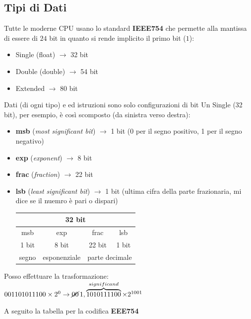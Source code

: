 \documentclass[a4paper,12pt, oneside]{book}
\begin{document}
\subsection{Tipi di Dati}
Tutte le moderne CPU usano lo standard \textbf{IEEE754} che permette alla mantissa di essere di $24$ bit  in quanto si rende implicito il primo bit ($1$):
\begin{itemize}
  \item Single (float) $\rightarrow$ 32 bit
  \item Double (double) $\rightarrow$ 54 bit
  \item Extended $\rightarrow$ 80 bit
\end{itemize}
Dati (di ogni tipo) e ed istruzioni sono solo configurazioni di bit
Un Single (32 bit), per esempio, è così scomposto (da sinistra verso destra):
\begin{itemize}
  \item \textbf{msb} (\textit{most significant bit}) $\rightarrow$ 1 bit (0 per il segno positivo, 1 per il segno negativo)
  \item \textbf{exp} (\textit{exponent}) $\rightarrow$ 8 bit
  \item \textbf{frac} (\textit{fraction}) $\rightarrow$ 22 bit
  \item \textbf{lsb} (\textit{least significant bit}) $\rightarrow$ 1 bit (ultima cifra della parte frazionaria, mi dice se il nuemro è pari o dispari)
  \begin{center}
    \begin{tabular}{c|c|c|c}
      \multicolumn{4}{c}{32 bit}                                        \\ \hline
      msb   & exp          & frac                               & lsb   \\ \hline
      1 bit & 8 bit        & 22 bit                             & 1 bit \\ \hline
      segno & esponenziale & \multicolumn{2}{c}{parte decimale}         \\ \hline
    \end{tabular}
  \end{center}
\end{itemize}
\begin{esempio}[???]
  Posso effettuare la trasformazione:\\
  $001101011100\times 2^0\rightarrow \cancel{00}\,1,\overbrace{1010111100}^{significand}\times 2^{1001}$
\end{esempio}
A seguito la tabella per la codifica \textbf{EEE754}
\end{document}
